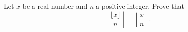 Let $x$ be a real number and $n$ a positive integer. Prove that
\[
\left\lfloor\dfrac{\lfloor x\rfloor}{n}\right\rfloor=\left\lfloor\dfrac{x}{n}\right\rfloor .
\]
